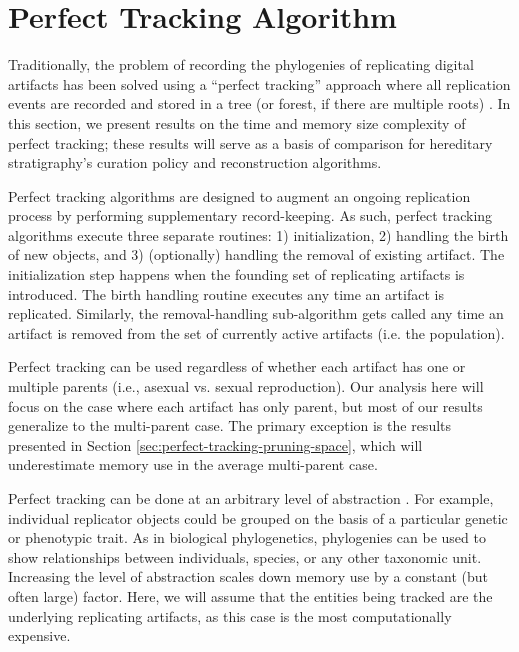 \section{Perfect Tracking Algorithm} \label{sec:perfect-tracking}

Traditionally, the problem of recording the phylogenies of replicating digital
artifacts has been solved using a ``perfect tracking'' approach where all replication
events are recorded and stored in a tree (or forest, if there are multiple roots) \citep{dolson2023phylotrackpy}.
In this section, we present results on the time and memory size complexity of perfect tracking;
these results will serve as a basis of comparison for hereditary stratigraphy's curation policy and reconstruction algorithms.

Perfect tracking algorithms are designed to augment an ongoing replication process by performing supplementary record-keeping.
As such, perfect tracking algorithms execute three separate routines: 1) initialization, 2) handling the birth of new objects, and 3) (optionally) handling the removal of existing artifact.
The initialization step happens when the founding set of replicating artifacts is introduced.
The birth handling routine executes any time an artifact is replicated.
Similarly, the removal-handling sub-algorithm gets called any time an artifact is removed from the set of currently active artifacts (i.e. the population).

Perfect tracking can be used regardless of whether each artifact has one or multiple parents (i.e., asexual vs. sexual reproduction).
Our analysis here will focus on the case where each artifact has only parent, but most of our results generalize to the multi-parent case.
The primary exception is the results presented in Section \ref{sec:perfect-tracking-pruning-space}, which will underestimate memory use in the average multi-parent case.

Perfect tracking can be done at an arbitrary level of abstraction \citep{dolson2020interpreting, dolson2023phylotrackpy}.
For example, individual replicator objects could be grouped on the basis of a particular genetic or phenotypic trait.
As in biological phylogenetics, phylogenies can be used to show relationships between individuals, species, or any other taxonomic unit.
Increasing the level of abstraction scales down memory use by a constant (but often large) factor.
Here, we will assume that the entities being tracked are the underlying replicating artifacts, as this case is the most computationally expensive.

